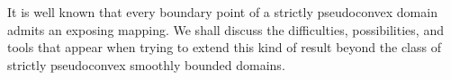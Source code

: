 {%
    It is well known that every boundary point of a strictly
    pseudoconvex domain admits an exposing mapping. We shall discuss
    the difficulties, possibilities, and tools that appear when
    trying to extend this kind of result beyond the class of
    strictly pseudoconvex smoothly bounded domains.
}

